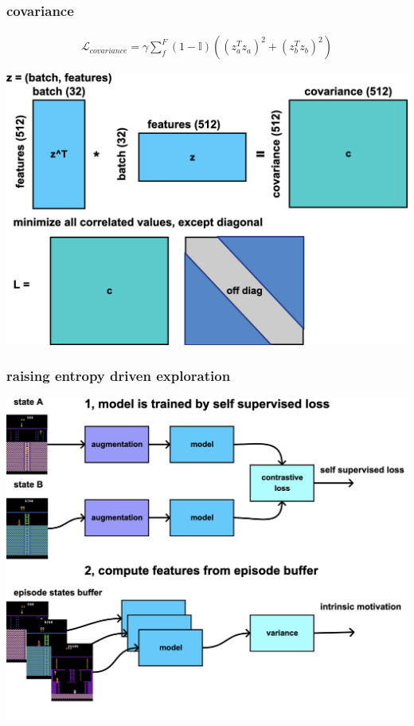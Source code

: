 \documentclass{beamer}
\begin{document}
\begin{frame}
  
  \frametitle{covariance}
 
  \begin{align*}
    \mathcal{L}_{covariance} = \gamma \sum_{f}^{F}(1 - \mathbb{I})\left( (z_a^Tz_a)^2 + (z_b^Tz_b)^2 \right)
  \end{align*}  

  \centering
  \includegraphics[scale=0.2]{../diagrams/cnd/covariance.png}

\end{frame}


\begin{frame}
  
  \frametitle{raising entropy driven exploration }

  \centering
  \includegraphics[scale=0.2]{../diagrams/cnd/entropy.png}

\end{frame}
\end{document}
